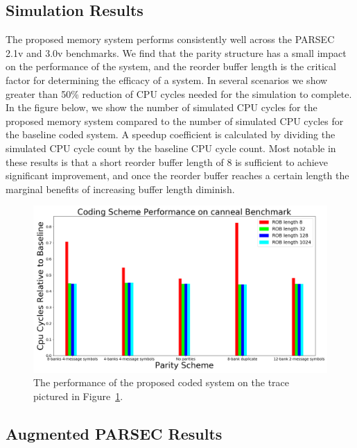\subsection{Simulation Results}
\label{sec:results}
The proposed memory system performs consistently well across the PARSEC 2.1v and 3.0v benchmarks. We find that the parity structure has a small impact on the performance of the system, and the reorder buffer length is  the critical factor for determining the efficacy of a system. In several scenarios we show greater than 50\% reduction of CPU cycles needed for the simulation to complete. In the figure below, we show the number of simulated CPU cycles for the proposed memory system compared to the number of simulated CPU cycles for the baseline coded system. A speedup coefficient is calculated by dividing the simulated CPU cycle count by the baseline CPU cycle count. Most notable in these results is that a short reorder buffer length of 8 is sufficient to achieve significant improvement, and once the reorder buffer reaches a certain length the marginal benefits of increasing buffer length diminish.

\begin{figure}[h!]
		\includegraphics[width=\linewidth]{figures/canneal_results.png}
		\caption{The performance of the proposed coded system on the trace pictured in Figure~\ref{fig:canneal_results}.}
		\label{fig:canneal_results}
\end{figure}
		

\subsection{Augmented PARSEC Results}
\label{sec:aug_results}

